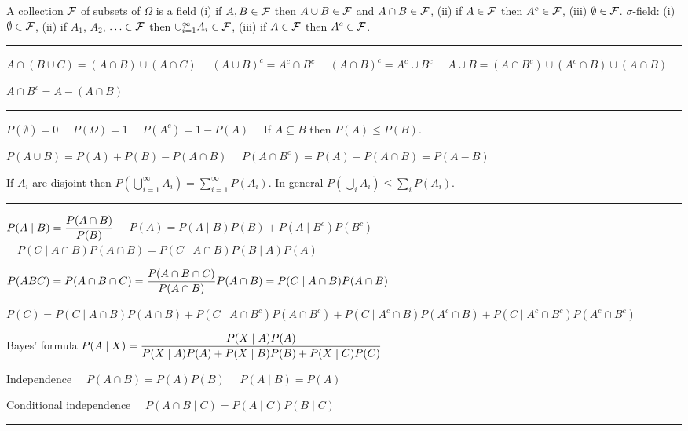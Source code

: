 \documentclass[10pt]{article}
\begin{document}
\begin{plain}


A collection $\cal F$ of subsets of $\Omega$ is a field
(i) if $A,B\in\cal F$ then $A\cup B\in\cal F$ and $A\cap B\in\cal F$,
(ii) if $A\in\cal F$ then $A^c\in\cal F$,
(iii) $\emptyset\in\cal F$.
$\sigma$-field:
(i) $\emptyset\in\cal F$,
(ii) if $A_1$, $A_2$, $\ldots\in\cal F$ then
$\cup_{i=1}^\infty A_i\in\cal F$,
(iii) if $A\in\cal F$ then $A^c\in\cal F$.

\smallskip
\hrule

\smallskip
$A\cap(B\cup C)=(A\cap B)\cup(A\cap C)$
$\quad(A\cup B)^c=A^c\cap B^c$
$\quad(A\cap B)^c=A^c\cup B^c$
$\quad A\cup B=(A\cap B^c)\cup(A^c\cap B)\cup(A\cap B)$

\smallskip
$A\cap B^c=A-(A\cap B)$

\smallskip
\hrule

\smallskip
$P(\emptyset)=0$
$\quad P(\Omega)=1$
$\quad P(A^c)=1-P(A)\quad$
If $A\subseteq B$ then $P(A)\le P(B)$.

\smallskip
$P(A\cup B)=P(A)+P(B)-P(A\cap B)$
$\quad P(A\cap B^c)=P(A)-P(A\cap B)=P(A-B)$

\smallskip
If $A_i$ are disjoint then
$\displaystyle P\left(\bigcup_{i=1}^\infty A_i\right)
=\sum_{i=1}^\infty P(A_i)$.
In general
$\displaystyle P\left(\bigcup_i A_i\right)\le\sum_i P(A_i)$.

\smallskip
\hrule

\smallskip
$\displaystyle P(A\mid B)={P(A\cap B)\over P(B)}$
$\quad P(A)=P(A\mid B)P(B)+P(A\mid B^c)P(B^c)$
$\quad P(C\mid A\cap B)P(A\cap B)=P(C\mid A\cap B)P(B\mid A)P(A)$

\smallskip
$\displaystyle P(ABC)=P(A\cap B\cap C)
={P(A\cap B\cap C)\over P(A\cap B)}P(A\cap B)
=P(C\mid A\cap B)P(A\cap B)$

\smallskip
$P(C)=P(C\mid A\cap B)P(A\cap B)
+P(C\mid A\cap B^c)P(A\cap B^c)
+P(C\mid A^c\cap B)P(A^c\cap B)
+P(C\mid A^c\cap B^c)P(A^c\cap B^c)$

\smallskip
Bayes' formula
$\displaystyle P(A\mid X)={P(X\mid A)P(A)\over
P(X\mid A)P(A)+P(X\mid B)P(B)+P(X\mid C)P(C)}$

\smallskip
Independence
$\quad P(A\cap B)=P(A)P(B)$
$\quad P(A\mid B)=P(A)$

\smallskip
Conditional independence
$\quad P(A\cap B\mid C)=P(A\mid C)P(B\mid C)$

\smallskip
\hrule


\end{plain}
\end{document}
